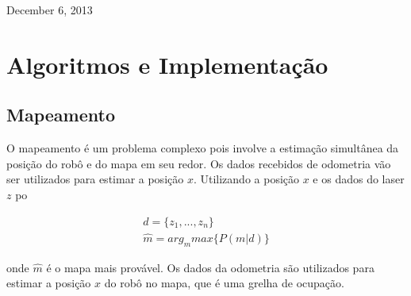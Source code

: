 \documentclass[journal]{IEEEtran}
\begin{document}



\hfill December 6, 2013

\section{Algoritmos e Implementação}

\subsection{Mapeamento}
%

O mapeamento é um problema complexo pois involve a estimação simultânea da posição do robô e do mapa em seu redor. Os dados recebidos de odometria vão ser utilizados para estimar a posição $x$. Utilizando a posição $x$ e os dados do laser $z$ po

\begin{eqnarray}
  \label{eq:map_1}
  d = \{ z_1,...,z_n \} \\
  \hat{m} = arg_m max \{ P(m|d) \}
\end{eqnarray}

onde $\hat{m}$ é o mapa mais provável. Os dados da odometria são utilizados para estimar a posição $x$ do robô no mapa, que é uma grelha de ocupação.
\end{document}
